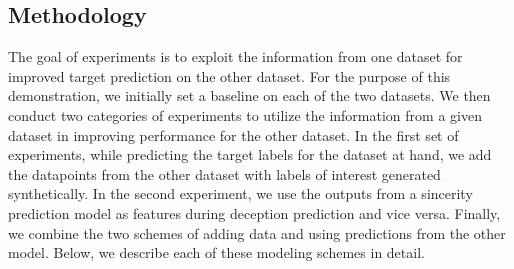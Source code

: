 \documentclass{article}
\begin{document}
\begin{spacing}{0.89}
\vspace{-3mm}
\section{Methodology}
\vspace{-3mm}

The goal of experiments is to exploit the information from one dataset for improved target prediction on the other dataset.
For the purpose of this demonstration, we initially set a baseline on each of the two datasets.
We then conduct two categories of experiments to utilize the information from a given dataset in improving performance for the other dataset. 
In the first set of experiments, while predicting the target labels for the dataset at hand, we add the datapoints from the other dataset with labels of interest generated synthetically. 
In the second experiment, we use the outputs from a sincerity prediction model as features during deception prediction and vice versa.
Finally, we combine the two schemes of adding data and using predictions from the other model.
Below, we describe each of these modeling schemes in detail. 

\vspace{-2mm}

\end{spacing}
\end{document}
